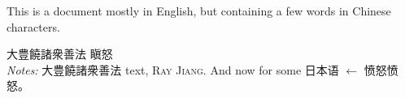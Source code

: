 \documentclass{article}
\begin{document}
This is a document mostly in English, but containing a few words in Chinese characters.

大豊饒諸衆善法
瞋怒
\\
\emph{Notes: }  大豊饒諸衆善法 text, \textsc{Ray Jiang}. And now for some 日本语 $\leftarrow$ 愤怒愤怒。
\end{document}
